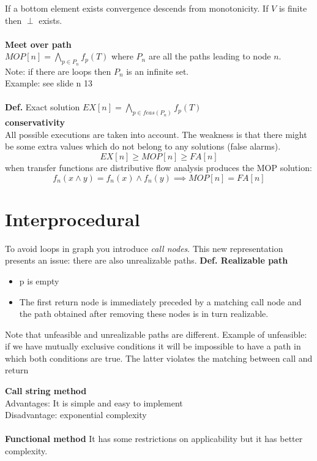 \documentclass[10pt,a4paper]{book}
\begin{document}
If a bottom element exists convergence descends from monotonicity. If $V$ is finite then $\perp$ exists.\\\\
\textbf{Meet over path}\\
$MOP[n] = \bigwedge_{p\in P_n}f_p(T)$ where $P_n$ are all the paths leading to node $n$.\\Note: if there are loops then $P_n$ is an infinite set.\\
Example: see slide n 13\\\\
\textbf{Def.} Exact solution $EX[n] = \bigwedge_{p \in feas(P_n)}f_p(T)$\\
\textbf{conservativity}\\
All possible executions are taken into account. The weakness is that there might be some extra values which do not belong to any solutions (false alarms). 
$$ EX[n] \geq MOP[n] \geq FA[n]$$
when transfer functions are distributive  flow analysis produces the MOP solution:
$$ f_n(x \wedge y) = f_n(x) \wedge f_n(y) \implies MOP[n] = FA[n] $$
\section{Interprocedural}
To avoid loops in graph you introduce \emph{call nodes}.
This new representation presents an issue: there are also unrealizable paths.
\textbf{Def. Realizable path}
\begin{itemize}
\item p is empty
\item The first return node is immediately preceded by a matching call node and the path obtained after removing these nodes is in turn realizable.
\end{itemize}
\begin{remark}
Note that unfeasible and unrealizable paths are different.
Example of unfeasible: if we have mutually exclusive conditions it will be impossible to have a path in which both conditions are true.
The latter violates the matching between call and return
\end{remark}
\textbf{Call string method}\\
Advantages: It is simple and easy to implement\\
Disadvantage: exponential complexity\\\\
\textbf{Functional method}
It has some restrictions on applicability but it has better complexity.
\end{document}
